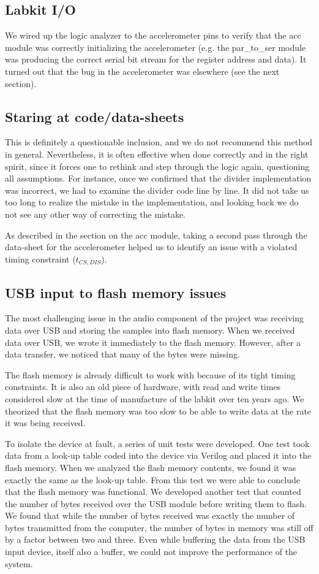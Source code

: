 \documentclass{article}
\begin{document}
\subsection{Labkit I/O}
We wired up the logic analyzer to the accelerometer pins to verify that the acc module was correctly initializing the accelerometer (e.g. the par\_to\_ser module was producing the correct serial bit stream for the register address and data).
It turned out that the bug in the accelerometer was elsewhere (see the next section).

\subsection{Staring at code/data-sheets}
This is definitely a questionable inclusion, and we do not recommend this method in general.
Nevertheless, it is often effective when done correctly and in the right spirit,
since it forces one to rethink and step through the logic again, questioning all assumptions.
For instance, once we confirmed that the divider implementation was incorrect,
we had to examine the divider code line by line.
It did not take us too long to realize the mistake in the implementation,
and looking back we do not see any other way of correcting the mistake.

As described in the section on the acc module, taking a second pass through the data-sheet for the accelerometer helped us to identify an issue with a violated timing constraint ($t_{CS,DIS}$).

\subsection{USB input to flash memory issues}
The most challenging issue in the audio component of the project was receiving data over USB and storing the samples into flash memory.
When we received data over USB, we wrote it immediately to the flash memory.
However, after a data transfer, we noticed that many of the bytes were missing.

The flash memory is already difficult to work with because of its tight timing constraints.
It is also an old piece of hardware, with read and write times considered slow at the time of manufacture of the labkit over ten years ago.
We theorized that the flash memory was too slow to be able to write data at the rate it was being received.

To isolate the device at fault, a series of unit tests were developed.
One test took data from a look-up table coded into the device via Verilog and placed it into the flash memory.
When we analyzed the flash memory contents, we found it was exactly the same as the look-up table.
From this test we were able to conclude that the flash memory was functional.
We developed another test that counted the number of bytes received over the USB module before writing them to flash.
We found that while the number of bytes received was exactly the number of bytes transmitted from the computer,
the number of bytes in memory was still off by a factor between two and three.
Even while buffering the data from the USB input device, itself also a buffer, we could not improve the performance of the system.
\end{document}
